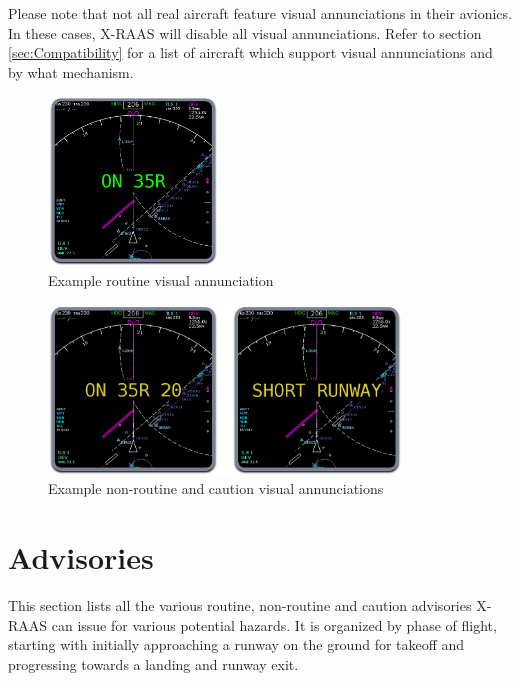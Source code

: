 \documentclass[a4paper,12pt]{article}
\begin{document}
Please note that not all real aircraft feature visual annunciations in
their avionics. In these cases, X-RAAS will disable all visual
annunciations. Refer to section \ref{sec:Compatibility} for a
list of aircraft which support visual annunciations and by what
mechanism.

\begin{figure}[H]
\begin{center}
\includegraphics[height=4.5cm]{../src/sample_ND_routine.png}
\end{center}
\caption{Example routine visual annunciation}
\label{fig:RoutineVisual}
\end{figure}

\begin{figure}[H]
\begin{center}
\vspace{2em}
\includegraphics[height=4.5cm]{../src/sample_ND_alert.png}
\end{center}
\caption{Example non-routine and caution visual annunciations}
\label{fig:NonroutineVisual}
\end{figure}

\newpage

\section{Advisories}

This section lists all the various routine, non-routine and caution
advisories X-RAAS can issue for various potential hazards. It is
organized by phase of flight, starting with initially approaching a
runway on the ground for takeoff and progressing towards a landing and
runway exit.
\end{document}
